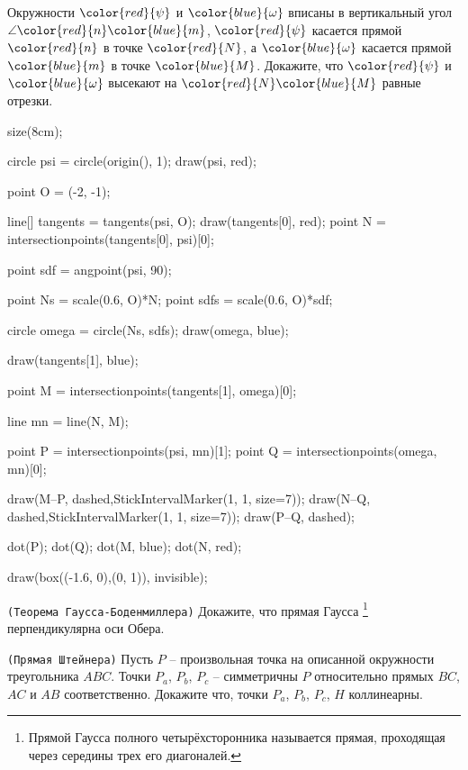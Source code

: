\documentclass[12pt, twoside]{article}
\newcommand{\task}[2]{\texttt{(#1)} #2}
\begin{document}
\begin{multicols}{2}
\begin{tasks}
			\item Окружности ${\color{red}{\psi}}$ и ${\color{blue}{\omega}}$ вписаны в вертикальный угол $\angle {\color{red}{n}}{\color{blue}{m}}$, ${\color{red}{\psi}}$ касается прямой ${\color{red}{n}}$ в точке ${\color{red}{N}}$, а ${\color{blue}{\omega}}$ касается прямой ${\color{blue}{m}}$ в точке ${\color{blue}{M}}$. Докажите, что ${\color{red}{\psi}}$ и ${\color{blue}{\omega}}$ высекают на ${\color{red}{N}}{\color{blue}{M}}$ равные отрезки. 
			
			\begin{center}
				\begin{asy}
				size(8cm);
				
				circle psi = circle(origin(), 1); draw(psi, red);
				
				point O = (-2, -1); 
				
				line[] tangents = tangents(psi, O);
				draw(tangents[0], red);
				point N = intersectionpoints(tangents[0], psi)[0];
				
				
				point sdf = angpoint(psi, 90); 
				
				point Ns = scale(0.6, O)*N; 
				point sdfs = scale(0.6, O)*sdf;
				
				circle omega = circle(Ns, sdfs); draw(omega, blue);
				
				draw(tangents[1], blue);
				
				point M = intersectionpoints(tangents[1], omega)[0];
				
				line mn = line(N, M);
				
				point P = intersectionpoints(psi, mn)[1]; 
				point Q = intersectionpoints(omega, mn)[0]; 
				
				draw(M--P, dashed,StickIntervalMarker(1, 1, size=7));
				draw(N--Q, dashed,StickIntervalMarker(1, 1, size=7));
				draw(P--Q, dashed);
				
				
				
				dot(P);
				dot(Q);
				dot(M, blue);
				dot(N, red);
				
				
				draw(box((-1.6, 0),(0, 1)), invisible);
				\end{asy}
			\end{center}
			
			\item \task{Теорема Гаусса-Боденмиллера}{Докажите, что прямая Гаусса \footnote{Прямой Гаусса полного четырёхсторонника называется прямая, проходящая через середины трех его диагоналей.} перпендикулярна оси Обера.}
			
			\item \task{Прямая Штейнера}{Пусть $P$ -- произвольная точка на описанной окружности треугольника $ABC$. Точки $P_a$, $P_b$, $P_c$ -- симметричны $P$ относительно прямых $BC$, $AC$ и $AB$ соответственно. Докажите что, точки $P_a$, $P_b$, $P_c$, $H$ коллинеарны.}
			

\end{tasks}
\end{multicols}
\end{document}
